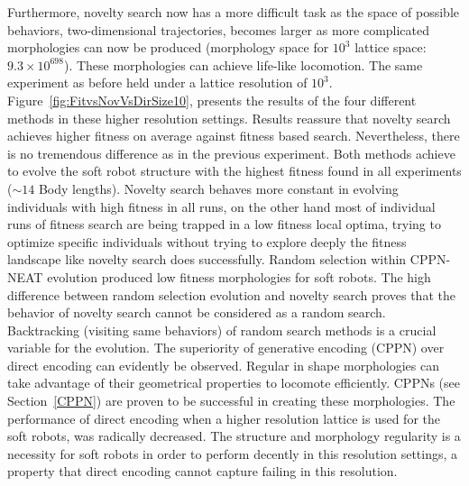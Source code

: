 Furthermore, novelty search now has a more difficult task as the space of possible behaviors, two-dimensional trajectories, becomes larger as more complicated morphologies can now be produced (morphology space for $10^3$ lattice space: $9.3 \times 10^{698}$). These morphologies can achieve life-like locomotion. The same experiment as before held under a lattice resolution of $10^3$. Figure~\ref{fig:FitvsNovVsDirSize10}, presents the results of the four different methods in these higher resolution settings. Results reassure that novelty search achieves higher fitness on average against fitness based search. Nevertheless, there is no tremendous difference as in the previous experiment. Both methods achieve to evolve the soft robot structure with the highest fitness found in all experiments ($\sim 14$ Body lengths). Novelty search behaves more constant in evolving individuals with high fitness in all runs, on the other hand most of individual runs of fitness search are being trapped in a low fitness local optima, trying to optimize specific individuals without trying to explore deeply the fitness landscape like novelty search does successfully. Random selection within CPPN-NEAT evolution produced low fitness morphologies for soft robots. The high difference between random selection evolution and novelty search proves that the behavior of novelty search cannot be considered as a random search. Backtracking (visiting same behaviors) of random search methods is a crucial variable for the evolution. The superiority of generative encoding (CPPN) over direct encoding can evidently be observed. Regular in shape morphologies can take advantage of their geometrical properties to locomote efficiently. CPPNs (see Section~\ref{CPPN}) are proven to be successful in creating these morphologies. The performance of direct encoding when a higher resolution lattice is used for the soft robots, was radically decreased. The structure and morphology regularity is a necessity for soft robots in order to perform decently in this resolution settings, a property that direct encoding cannot capture failing in this resolution.

